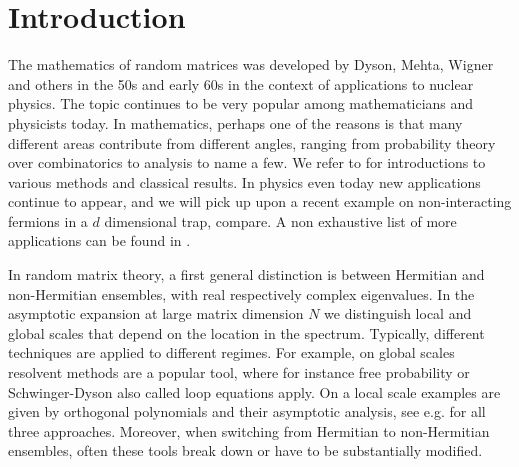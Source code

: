 \documentclass[%
 jmp,
cp,  %
 amsmath,amsthm,amssymb,%
 reprint,%
onecolumn]{revtex4-2}
\begin{document}
\maketitle



\section{Introduction} \label{sec:1}


The mathematics of random matrices was developed by Dyson, Mehta, Wigner and others in the 50s and early 60s in the context of applications to nuclear physics. The topic continues to be very popular among mathematicians and physicists today. In mathematics, perhaps one of the reasons is that many different areas contribute from different angles, ranging from probability theory over combinatorics to analysis to name a few. We refer to \cite{LNV,AGZ} for introductions to various methods and classical results. 
In physics even today new applications continue to appear, and we will pick up upon a recent example on non-interacting fermions in a $d$ dimensional trap, compare\cite{DeDoMaSc3}.  A non exhaustive list of more applications can be found in \cite{ABD} .

In random matrix theory, a first general distinction is between Hermitian and non-Hermitian ensembles, with real respectively  complex eigenvalues. In the asymptotic expansion at large matrix dimension $N$ we distinguish local and global scales
that depend on the location in the spectrum. Typically, different techniques are applied to different regimes. For example, on global scales resolvent methods are a popular tool, where for instance free probability or Schwinger-Dyson also called loop equations apply. 
On a local scale examples are given by orthogonal polynomials and their asymptotic analysis, see e.g. \cite{AGZ} for all three approaches. 
Moreover, when switching from Hermitian to non-Hermitian ensembles, often these tools break down or have to be substantially modified.
\end{document}
